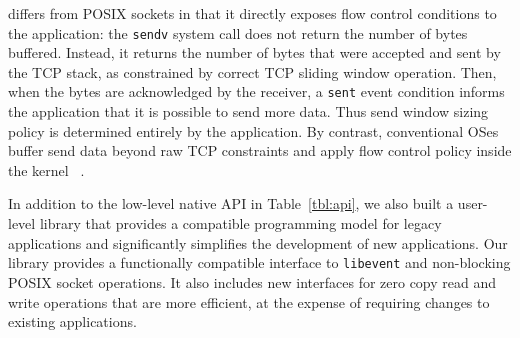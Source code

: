 \ix differs from POSIX sockets in that it directly exposes flow
control conditions to the application: the \texttt{sendv} system call
does not return the number of bytes buffered. Instead, it returns
the number of bytes that were accepted and sent by the TCP
stack, as constrained by correct TCP sliding window operation. Then,
when the bytes are acknowledged by the receiver, a \texttt{sent} event
condition informs the application that it is possible to send more
data. Thus send window sizing policy is determined entirely by the
application.  By contrast, conventional OSes buffer send data beyond
raw TCP constraints and apply flow control policy inside the kernel
~\cite{dynamicwindow}.



In addition to the low-level native \ix API in Table~\ref{tbl:api}, we
also built a user-level library that provides a compatible programming
model for legacy applications and significantly simplifies the
development of new applications. Our library provides a functionally
compatible interface to \texttt{libevent} and non-blocking POSIX
socket operations. It also includes new interfaces for zero copy read
and write operations that are more efficient, at the expense of
requiring changes to existing applications. 

 


